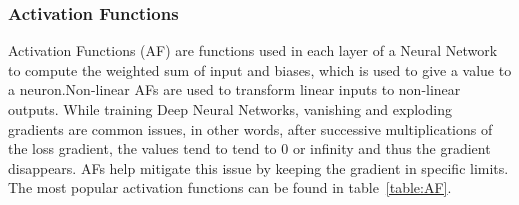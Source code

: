 \subsubsection{Activation Functions}

Activation Functions (AF) are functions used in each layer of a Neural Network to compute the weighted sum of input and biases,
which is used to give a value to a neuron.Non-linear AFs are used to transform linear inputs to non-linear outputs.
 While training Deep Neural Networks, vanishing and exploding gradients
are common issues, in other words, after successive multiplications of the loss gradient, the values tend to tend to 0 or infinity and thus the gradient disappears.
AFs help mitigate this issue by keeping the gradient in specific limits. The most popular activation functions can be found in table~\ref{table:AF}.



\begin{table}[]
    \centering
    \resizebox{.6\textwidth}{!}{%
    \begin{tabular}{ll}
    \hline
    \textbf{Activation Functions} & \textbf{Computation Equation} \\ \hline \hline
    Sigmoid                       &  $\displaystyle f(x)=\frac{1}{1+ e^{-x}}$                             \\ \hline
    Tanh                          &  $\displaystyle f(x)=\frac{e^{x}-e^{-x}}{e^{x}+e^{-x}}$                            \\ \hline
    Softmax                       &  $\displaystyle f(x_{i})=\frac{x_{i}}{\sum_{j}e^{x_{j}}}$                             \\ \hline
    ReLU                          &    $ f(x)=\begin{matrix}
        x & if & x\geq 0  \\ 
        0 & if & x< 0 
    \end{matrix} $                           \\ \hline
    LReLU                         &  $f(x)= \begin{matrix}
        x & if & x > 0  \\ 
        \alpha x & if & x \leq 0 
    \end{matrix} $                        \\ \hline
    ELU                           &             $ f(x)=\begin{matrix}
        x & if & x> 0  \\ 
        \alpha e^{x} - 1 & if & x\leq 0 
    \end{matrix} $                 \\ \hline
    \end{tabular}%
    }
    \caption{Popular Activation functions}
    \label{table:AF}
\end{table}


